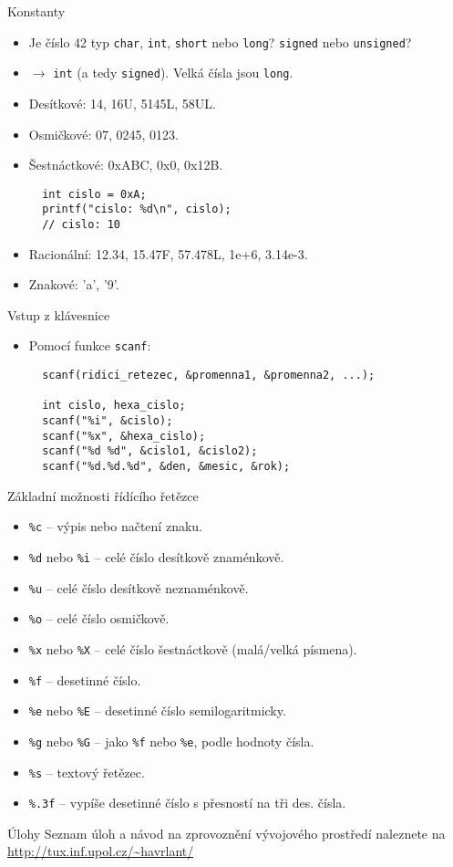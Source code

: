 \documentclass{beamer}
\newenvironment{itemizex}%
  {\large \begin{itemize}%
    \setlength{\itemsep}{8pt}%
    \setlength{\parskip}{8pt}}%
  {\end{itemize}}
\begin{document}
\begin{frame}[t,fragile]{Konstanty}
\begin{itemize}
  \item Je číslo 42 typ \texttt{char}, \texttt{int}, \texttt{short} nebo \texttt{long}? \texttt{signed} nebo \texttt{unsigned}?
  \item $\rightarrow$ \texttt{int} (a tedy \texttt{signed}). Velká čísla jsou \texttt{long}.
  \item Desítkové: 14, 16U, 5145L, 58UL.
  \item Osmičkové: 07, 0245, 0123.
  \item Šestnáctkové: 0xABC, 0x0, 0x12B.
  \begin{verbatim} 
  int cislo = 0xA;
  printf("cislo: %d\n", cislo);
  // cislo: 10
  \end{verbatim}
  \item Racionální: 12.34, 15.47F, 57.478L, 1e+6, 3.14e-3.
  \item Znakové: 'a', '9'. 
\end{itemize}
\end{frame}


\begin{frame}[t,fragile]{Vstup z klávesnice}
\begin{itemizex}
  \item Pomocí funkce \texttt{scanf}:
  \begin{verbatim} 
  scanf(ridici_retezec, &promenna1, &promenna2, ...);

  int cislo, hexa_cislo;
  scanf("%i", &cislo);
  scanf("%x", &hexa_cislo);
  scanf("%d %d", &cislo1, &cislo2);
  scanf("%d.%d.%d", &den, &mesic, &rok);
  \end{verbatim}
\end{itemizex}
\end{frame}

\begin{frame}[t,fragile]{Základní možnosti řídícího řetězce}
\begin{itemize}
  \item \texttt{\%c} -- výpis nebo načtení znaku.
  \item \texttt{\%d} nebo \texttt{\%i} -- celé číslo desítkově znaménkově.
  \item \texttt{\%u} -- celé číslo desítkově neznaménkově.
  \item \texttt{\%o} -- celé číslo osmičkově.
  \item \texttt{\%x} nebo \texttt{\%X} -- celé číslo šestnáctkově (malá/velká písmena).
  \item \texttt{\%f} -- desetinné číslo.
  \item \texttt{\%e} nebo \texttt{\%E} -- desetinné číslo semilogaritmicky.
  \item \texttt{\%g} nebo \texttt{\%G} -- jako \texttt{\%f} nebo \texttt{\%e}, podle hodnoty čísla.
  \item \texttt{\%s} -- textový řetězec.
  \item \texttt{\%.3f} -- vypíše desetinné číslo s přesností na tři des. čísla.
\end{itemize}
\end{frame}


\begin{frame}[t,fragile]{Úlohy}
Seznam úloh a návod na zprovoznění vývojového prostředí naleznete na \url{http://tux.inf.upol.cz/~havrlant/}
\end{frame}
\end{document}
